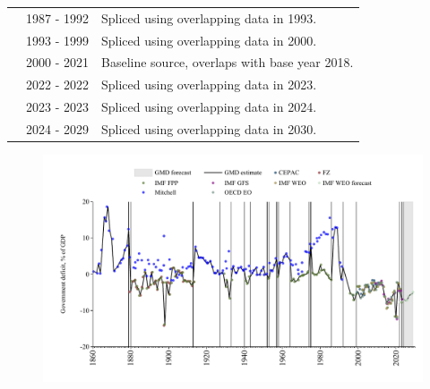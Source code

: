 \documentclass[12pt,a4paper,landscape]{article}
\begin{document}
\begin{adjustbox}{max totalsize={\paperwidth}{\paperheight},center}
\begin{minipage}[t][\textheight][t]{\textwidth}
\begin{table}[H]
\begin{tabular}{|l|l|l|}
\rowcolor{lightgray}\cite{Mitchell}& 1987 - 1992 &Spliced using overlapping data in 1993.\\
\rowcolor{white}\cite{IMF_FPP}& 1993 - 1999 &Spliced using overlapping data in 2000.\\
\rowcolor{lightgray}\cite{OECD_EO}& 2000 - 2021 &Baseline source, overlaps with base year 2018.\\
\rowcolor{white}\cite{IMF_WEO}& 2022 - 2022 &Spliced using overlapping data in 2023.\\
\rowcolor{lightgray}\cite{IMF_GFS}& 2023 - 2023 &Spliced using overlapping data in 2024.\\
\rowcolor{white}\cite{IMF_WEO_forecast}& 2024 - 2029 &Spliced using overlapping data in 2030.\\
\hline
\end{tabular}
\end{table}
\begin{figure}[H]
\centering
\includegraphics[width=\textwidth,height=0.6\textheight,keepaspectratio]{graphs/BRA_govdef_GDP.pdf}
\end{figure}
\end{minipage}
\end{adjustbox}
\end{document}
